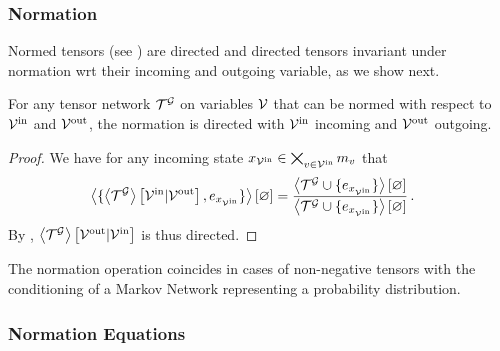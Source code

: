 \subsubsection{Normation}

Normed tensors (see ) are directed and directed tensors invariant under normation wrt their incoming and outgoing variable, as we show next.

\begin{theorem}
    \label{the:normationDirected}
    For any tensor network $\mathcal{T}^{\mathcal{G}}$ on variables $\mathcal{V}$ that can be normed with respect to $\mathcal{V}^{\mathrm{in}}$ and $\mathcal{V}^{\mathrm{out}}$, the normation is directed with $\mathcal{V}^{\mathrm{in}}$ incoming and $\mathcal{V}^{\mathrm{out}}$ outgoing.
\end{theorem}
\begin{proof}
    We have for any incoming state ${x_{\mathcal{V}^{\mathrm{in}}}\in\bigtimes_{v\in\mathcal{V}^{\mathrm{in}}}m_{v}}$ that
    \begin{align*}
        \left\langle \{\left\langle \mathcal{T}^{\mathcal{G}}\right\rangle \left[ \mathcal{V}^{\mathrm{in}} | \mathcal{V}^{\mathrm{out}} \right], e_{x_{\mathcal{V}^{\mathrm{in}}}} \}\right\rangle \left[ \varnothing \right]
        & =  \frac{
            \left\langle \mathcal{T}^{\mathcal{G}}\cup\{e_{x_{\mathcal{V}^{\mathrm{in}}}}\}\right\rangle \left[ \varnothing \right]
        }{
            \left\langle \mathcal{T}^{\mathcal{G}}\cup\{e_{x_{\mathcal{V}^{\mathrm{in}}}}\}\right\rangle \left[ \varnothing \right]
        } \, .
    \end{align*}
    By , $\left\langle \mathcal{T}^{\mathcal{G}}\right\rangle \left[ \mathcal{V}^{\mathrm{out}} | \mathcal{V}^{\mathrm{in}} \right]$ is thus directed.
\end{proof}

The normation operation coincides in cases of non-negative tensors with the conditioning of a Markov Network representing a probability distribution.

\subsubsection{Normation Equations}



